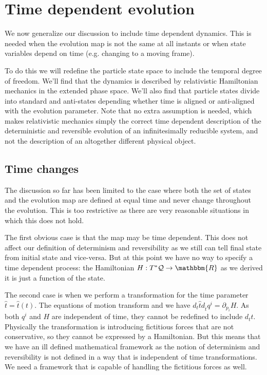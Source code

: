 \documentclass[aps,pra,10pt,twocolumn,floatfix,nofootinbib]{revtex4-1}
\numberwithin{equation}{section}
\theoremstyle{definition}
\begin{document}
\section{Time dependent evolution}

We now generalize our discussion to include time dependent dynamics. This is needed when the evolution map is not the same at all instants or when state variables depend on time (e.g. changing to a moving frame).

To do this we will redefine the particle state space to include the temporal degree of freedom. We'll find that the dynamics is described by relativistic Hamiltonian mechanics in the extended phase space. We'll also find that particle states divide into standard and anti-states depending whether time is aligned or anti-aligned with the evolution parameter. Note that no extra assumption is needed, which makes relativistic mechanics simply the correct time dependent description of the deterministic and reversible evolution of an infinitesimally reducible system, and not the description of an altogether different physical object.

\subsection{Time changes}

The discussion so far has been limited to the case where both the set of states and the evolution map are defined at equal time and never change throughout the evolution. This is too restrictive as there are very reasonable situations in which this does not hold.

The first obvious case is that the map may be time dependent. This does not affect our definition of determinism and reversibility as we still can tell final state from initial state and vice-versa. But at this point we have no way to specify a time dependent process: the Hamiltonian $H: T^*\mathcal{Q} \rightarrow \mathbbm{R}$ as we derived it is just a function of the state.

The second case is when we perform a transformation for the time parameter $\hat{t}=\hat{t}(t)$. The equations of motion transform and we have $d_{t}\hat{t} d_{\hat{t}}q^i = \partial_{p_i} H$. As both $q^i$ and $H$ are independent of time, they cannot be redefined to include $d_{t}\hat{t}$. Physically the transformation is introducing fictitious forces that are not conservative, so they cannot be expressed by a Hamiltonian. But this means that we have an ill defined mathematical framework as the notion of determinism and reversibility is not defined in a way that is independent of time transformations. We need a framework that is capable of handling the fictitious forces as well.
\end{document}
